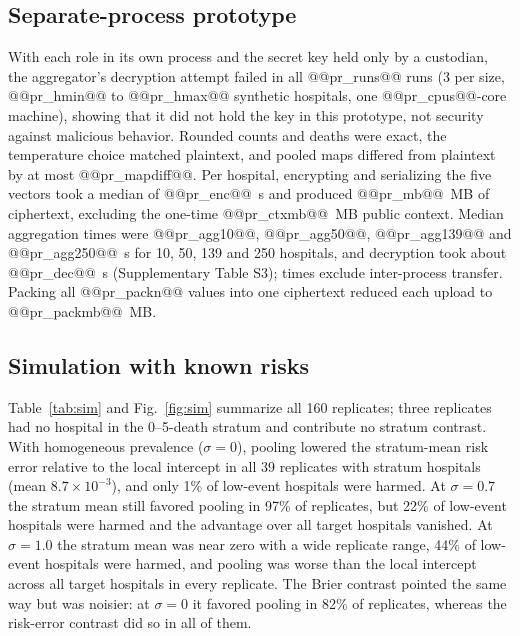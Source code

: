 \documentclass[11pt]{article}
\begin{document}
\subsection*{Separate-process prototype}
With each role in its own process and the secret key held only by a custodian, the aggregator's decryption attempt failed in all @@pr_runs@@ runs (3 per size, @@pr_hmin@@ to @@pr_hmax@@ synthetic hospitals, one @@pr_cpus@@-core machine), showing that it did not hold the key in this prototype, not security against malicious behavior. Rounded counts and deaths were exact, the temperature choice matched plaintext, and pooled maps differed from plaintext by at most @@pr_mapdiff@@. Per hospital, encrypting and serializing the five vectors took a median of @@pr_enc@@~s and produced @@pr_mb@@~MB of ciphertext, excluding the one-time @@pr_ctxmb@@~MB public context. Median aggregation times were @@pr_agg10@@, @@pr_agg50@@, @@pr_agg139@@ and @@pr_agg250@@~s for 10, 50, 139 and 250 hospitals, and decryption took about @@pr_dec@@~s (Supplementary Table S3); times exclude inter-process transfer. Packing all @@pr_packn@@ values into one ciphertext reduced each upload to @@pr_packmb@@~MB.

\subsection*{Simulation with known risks}\label{simulation-results}

Table~\ref{tab:sim} and Fig.~\ref{fig:sim} summarize all 160 replicates; three replicates had no hospital in the 0--5-death stratum and contribute no stratum contrast. With homogeneous prevalence ($\sigma=0$), pooling lowered the stratum-mean risk error relative to the local intercept in all 39 replicates with stratum hospitals (mean $8.7\times10^{-3}$), and only 1\% of low-event hospitals were harmed. At $\sigma=0.7$ the stratum mean still favored pooling in 97\% of replicates, but 22\% of low-event hospitals were harmed and the advantage over all target hospitals vanished. At $\sigma=1.0$ the stratum mean was near zero with a wide replicate range, 44\% of low-event hospitals were harmed, and pooling was worse than the local intercept across all target hospitals in every replicate. The Brier contrast pointed the same way but was noisier: at $\sigma=0$ it favored pooling in 82\% of replicates, whereas the risk-error contrast did so in all of them.
\end{document}

